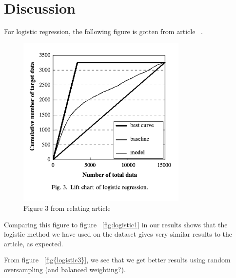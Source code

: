 \section{Discussion}

For logistic regression, the following figure is gotten from 
article ~\cite{ComparisonData}. 

\begin{figure}[H]
\begin{center}
    \includegraphics[width=0.75\textwidth, height=0.5\textheight]{figures/logistic_article.png}
\end{center}
\caption[caption]{Figure 3 from relating article ~\cite{ComparisonData}}
\end{figure}

Comparing this figure to figure ~\ref{fig:logistic1} in our 
results shows that the logistic method we have used on the 
dataset gives very similar results to the article, as expected. 

From figure ~\ref{fig{logistic3}}, we see that we get 
better results using random oversampling (and balanced weighting?). 

